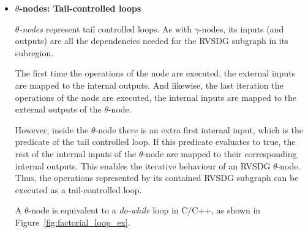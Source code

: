 \begin{itemize}
\item \textbf{$\theta$-nodes: Tail-controlled loops}

\textit{$\theta$-nodes} represent tail controlled loops. As with
$\gamma$-nodes, its inputs (and outputs) are all the dependencies needed for the
RVSDG subgraph in its subregion.

The first time the operations of the node are executed, the external inputs are
mapped to the internal outputs. And likewise, the last iteration the operations
of the node are executed, the internal inputs are mapped to the external outputs
of the $\theta$-node.

However, inside the $\theta$-node there is an extra first internal input, which
is the predicate of the tail controlled loop. If this predicate evaluates to
true, the rest of the internal inputs of the $\theta$-node are mapped to their
corresponding internal outputs. This enables the iterative behaviour of an RVSDG
$\theta$-node. Thus, the operations represented by its contained RVSDG subgraph
can be executed as a tail-controlled loop.

A $\theta$-node is equivalent to a \textit{do-while} loop in C/C++, as shown in
Figure~\ref{fig:factorial_loop_ex}.


\end{itemize}
